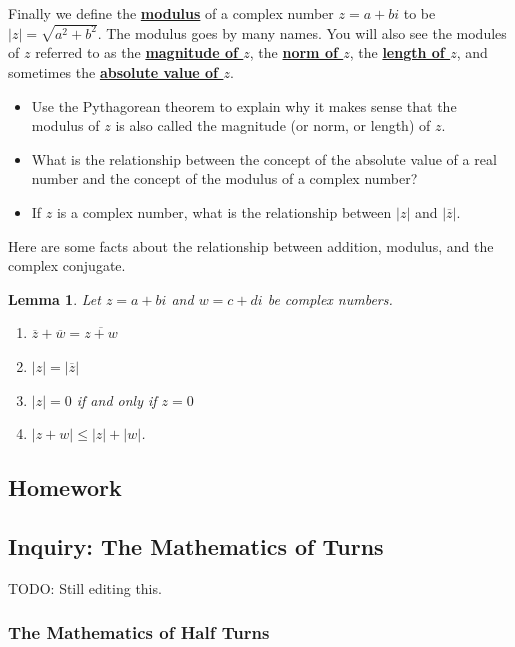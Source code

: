 \documentclass[11pt]{article}
\newenvironment{task}
	{\begin{mdframed}[linecolor=lightgray, linewidth=3pt]\raggedright}
	{\end{mdframed}}
\renewcommand\emph[1]{\underline{\bf{#1}}} %
\newtheorem{lemma}[theorem]{Lemma}
\theoremstyle{definition}
\begin{document}
Finally we define the \emph{modulus} of a complex number $z=a+bi$ to be $|z| = \sqrt{a^2+b^2}$. The modulus goes by many names. You will also see the modules of $z$
referred to as the \emph{magnitude of $z$}, the \emph{norm of $z$}, the \emph{length of $z$}, and sometimes the \emph{absolute value of $z$}.

\begin{task}
  \begin{itemize}
    \item Use the Pythagorean theorem to explain why it makes sense that the modulus of $z$ is also called the magnitude (or norm, or length) of $z$.
    \item What is the relationship between the concept of the absolute value of a real number and the concept of the modulus of a complex number?
    \item If $z$ is a complex number, what is the relationship between $|z|$ and $|\overline{z}|$.
  \end{itemize}
\end{task}

Here are some facts about the relationship between addition, modulus, and the complex conjugate.

\begin{lemma} Let $z=a+bi$ and $w=c+di$ be complex numbers.
  \begin{enumerate}
    \item $\overline{z} + \overline{w} = \overline{z+w}$
    \item $|z| = |\overline{z}|$
    \item $|z|=0$ if and only if $z=0$
    \item $|z+w| \leq |z| + |w|$.
  \end{enumerate}
\end{lemma}

\newpage
\subsection{Homework}

\newpage

\subsection{Inquiry: The Mathematics of Turns}

TODO: Still editing this.

\subsubsection{The Mathematics of Half Turns}
\end{document}
